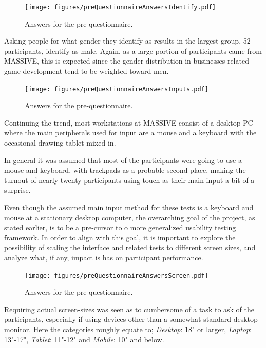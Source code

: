 \documentclass[nofilelist,dvipsnames]{cslthse-msc}
\begin{document}
				\begin{figure}[h!]
					\centering
					\texttt{[image: figures/preQuestionnaireAnswersIdentify.pdf]}
					\caption{Answers for the pre-questionnaire.}
				\end{figure}

        Asking people for what gender they identify as results in the largest
        group, 52 participants, identify as male. Again, as a large portion of
        participants came from MASSIVE, this is expected since the gender
        distribution in businesses related game-development tend to be weighted
        toward men\findref\findref.

				\begin{figure}[h!]
					\centering
					\texttt{[image: figures/preQuestionnaireAnswersInputs.pdf]}
					\caption{Answers for the pre-questionnaire.}
				\end{figure}

        Continuing the trend, most workstations at MASSIVE consist of a
        desktop PC where the main peripherals used for input are a mouse and a
        keyboard with the occasional drawing tablet mixed in.

        In general it was assumed that most of the participants were going to
        use a mouse and keyboard, with trackpads as a probable second place,
        making the turnout of nearly twenty participants using touch as their
        main input a bit of a surprise.

        Even though the assumed main input method for these tests is a keyboard
        and mouse at a stationary desktop computer, the overarching goal of the
        project, as stated earlier, is to be a pre-cursor to o more generalized
        usability testing framework. In order to align with this goal, it is
        important to explore the possibility of scaling the interface and
        related tests to different screen sizes, and analyze what, if any,
        impact is has on participant performance.

				\begin{figure}[h!]
					\centering
					\texttt{[image: figures/preQuestionnaireAnswersScreen.pdf]}
					\caption{Answers for the pre-questionnaire.}
				\end{figure}

        Requiring actual screen-sizes was seen as to cumbersome of a task to
        ask of the participants, especially if using devices other than a
        somewhat standard desktop monitor. Here the categories roughly equate
        to; \textit{Desktop}: 18" or larger, \textit{Laptop}: 13"-17", \textit{Tablet}:
        11"-12" and \textit{Mobile}: 10" and below.
\end{document}
